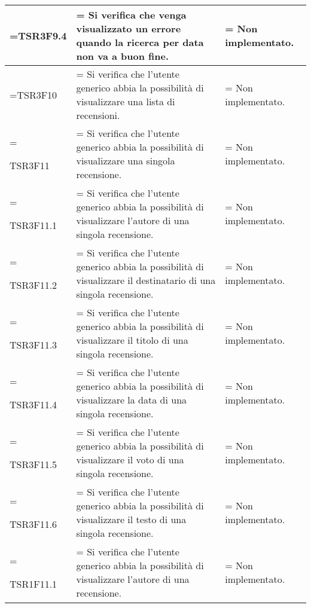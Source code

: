 \begin{xltabular}{\textwidth} {
            >{\hsize\linewidth=\hsize}X
            >{\hsize\linewidth=\hsize}X
            >{\hsize\linewidth=\hsize}X
        }
        TSR3F9.4&
        Si verifica che venga visualizzato un errore quando la ricerca per data non va a buon fine. &
        Non implementato.
        \\ \hline

        TSR3F10 &
        Si verifica che l'utente generico abbia la possibilità di visualizzare una lista di recensioni.  &
        Non implementato.
        \\ \hline

        TSR3F11 &
        Si verifica che l'utente generico abbia la possibilità di visualizzare una singola recensione. &
        Non implementato.
        \\ \hline

        TSR3F11.1 &
        Si verifica che l'utente generico abbia la possibilità di visualizzare l'autore di una singola recensione.  &
        Non implementato.
        \\ \hline

        TSR3F11.2 &
        Si verifica che l'utente generico abbia la possibilità di visualizzare il destinatario di una singola recensione.  &
        Non implementato.
        \\ \hline

        TSR3F11.3 &
        Si verifica che l'utente generico abbia la possibilità di visualizzare il titolo di una singola recensione.  &
        Non implementato.
        \\ \hline

        TSR3F11.4 &
        Si verifica che l'utente generico abbia la possibilità di visualizzare la data di una singola recensione.  &
        Non implementato.
        \\ \hline
        
        TSR3F11.5 &
        Si verifica che l'utente generico abbia la possibilità di visualizzare il voto di una singola recensione.  &
        Non implementato.
        \\ \hline

        TSR3F11.6 &
        Si verifica che l'utente generico abbia la possibilità di visualizzare il testo di una singola recensione.  &
        Non implementato.
        \\ \hline
        
        TSR1F11.1 &
        Si verifica che l'utente generico abbia la possibilità di visualizzare l'autore di una recensione.  &
        Non implementato.
        \\ \hline
        

\end{xltabular}
